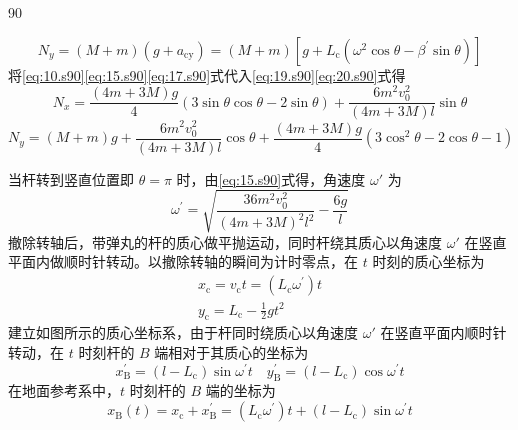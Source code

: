 \begin{solution}{90}
\begin{subsolution}
\begin{equation}
\label{eq:19.s90}
\end{equation}
\begin{equation}
N _ {y} = (M + m) \left(g + a _ {\mathrm{cy}}\right) = (M + m) \left[ g + L _ {\mathrm{c}} \left(\omega^ {2} \cos \theta - \beta^ {\prime} \sin \theta\right) \right]
\label{eq:20.s90}
\end{equation}
将\eqref{eq:10.s90}\eqref{eq:15.s90}\eqref{eq:17.s90}式代入\eqref{eq:19.s90}\eqref{eq:20.s90}式得
\begin{equation}
N _ {x} = \frac {(4 m + 3 M) g}{4} (3 \sin \theta \cos \theta - 2 \sin \theta) + \frac {6 m ^ {2} v _ {0} ^ {2}}{(4 m + 3 M) l} \sin \theta
\label{eq:21.s90}
\end{equation}
\begin{equation}
N _ {y} = (M + m) g + \frac {6 m ^ {2} v _ {0} ^ {2}}{(4 m + 3 M) l} \cos \theta + \frac {(4 m + 3 M) g}{4} (3 \cos^ {2} \theta - 2 \cos \theta - 1)
\label{eq:22.s90}
\end{equation}
\end{subsolution}
\begin{subsolution}
当杆转到竖直位置即 $\theta = \pi$ 时，由\eqref{eq:15.s90}式得，角速度 $\omega'$ 为
\begin{equation}
\omega^ {\prime} = \sqrt {\frac {3 6 m ^ {2} v _ {0} ^ {2}}{(4 m + 3 M) ^ {2} l ^ {2}} - \frac {6 g}{l}}
\label{eq:23.s90}
\end{equation}
撤除转轴后，带弹丸的杆的质心做平抛运动，同时杆绕其质心以角速度 $\omega'$ 在竖直平面内做顺时针转动。以撤除转轴的瞬间为计时零点，在 $t$ 时刻的质心坐标为
\begin{equation}
\begin{array}{l} x _ {\mathrm{c}} = v _ {\mathrm{c}} t = \left(L _ {\mathrm{c}} \omega^ {\prime}\right) t \\ y _ {\mathrm{c}} = L _ {\mathrm{c}} - \frac {1}{2} g t ^ {2} \end{array}
\label{eq:24.s90}
\end{equation}
建立如图所示的质心坐标系，由于杆同时绕质心以角速度 $\omega'$ 在竖直平面内顺时针转动，在 $t$ 时刻杆的 $B$ 端相对于其质心的坐标为
\begin{equation}
x _ {\mathrm{B}} ^ {\prime} = \left(l - L _ {\mathrm{c}}\right) \sin \omega^ {\prime} t \quad y _ {\mathrm{B}} ^ {\prime} = \left(l - L _ {\mathrm{c}}\right) \cos \omega^ {\prime} t
\label{eq:25.s90}
\end{equation}
在地面参考系中，$t$ 时刻杆的 $B$ 端的坐标为
\begin{equation}
x _ {\mathrm{B}} (t) = x _ {\mathrm{c}} + x _ {\mathrm{B}} ^ {\prime} = \left(L _ {\mathrm{c}} \omega^ {\prime}\right) t + \left(l - L _ {\mathrm{c}}\right) \sin \omega^ {\prime} t

\end{equation}
\end{subsolution}
\end{solution}

